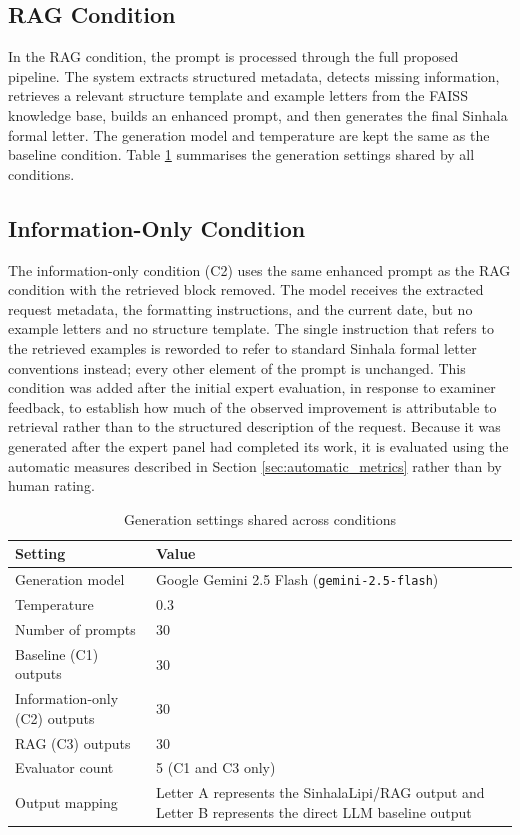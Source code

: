 \documentclass[12pt]{uomthesis}
\begin{document}
\subsection{RAG Condition}

In the RAG condition, the prompt is processed through the full proposed pipeline. The system extracts structured metadata, detects missing information, retrieves a relevant structure template and example letters from the FAISS knowledge base, builds an enhanced prompt, and then generates the final Sinhala formal letter. The generation model and temperature are kept the same as the baseline condition. Table \ref{tab:evaluation_generation_settings} summarises the generation settings shared by all conditions.

\subsection{Information-Only Condition}

The information-only condition (C2) uses the same enhanced prompt as the RAG condition with the retrieved block removed. The model receives the extracted request metadata, the formatting instructions, and the current date, but no example letters and no structure template. The single instruction that refers to the retrieved examples is reworded to refer to standard Sinhala formal letter conventions instead; every other element of the prompt is unchanged. This condition was added after the initial expert evaluation, in response to examiner feedback, to establish how much of the observed improvement is attributable to retrieval rather than to the structured description of the request. Because it was generated after the expert panel had completed its work, it is evaluated using the automatic measures described in Section \ref{sec:automatic_metrics} rather than by human rating.

\begin{table}[!htbp]
\centering
\small
\begin{tabularx}{\linewidth}{@{}lX@{}}
\toprule
\textbf{Setting} & \textbf{Value} \\
\midrule
Generation model & Google Gemini 2.5 Flash (\texttt{gemini-2.5-flash}) \\
Temperature & 0.3 \\
Number of prompts & 30 \\
Baseline (C1) outputs & 30 \\
Information-only (C2) outputs & 30 \\
RAG (C3) outputs & 30 \\
Evaluator count & 5 (C1 and C3 only) \\
Output mapping & Letter A represents the SinhalaLipi/RAG output and Letter B represents the direct LLM baseline output \\
\bottomrule
\end{tabularx}
\caption{Generation settings shared across conditions}
\label{tab:evaluation_generation_settings}
\end{table}
\end{document}
